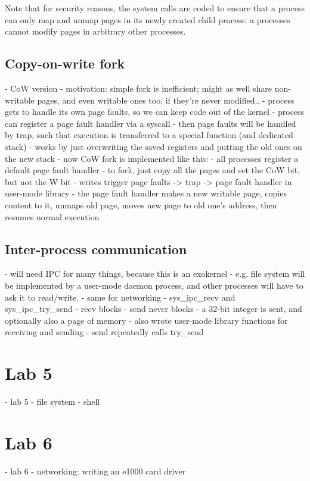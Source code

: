 \documentclass{article}
\begin{document}
Note that for security reasons, the system calls are coded to ensure that a
process can only map and unmap pages in its newly created child process; a
processes cannot modify pages in arbitrary other processes.


\subsection{Copy-on-write fork}

- CoW version
	- motivation: simple fork is inefficient; might as well share non-writable
	  pages, and even writable ones too, if they're never modified..
	- process gets to handle its own page faults, so we can keep code out of
	  the kernel
	- process can register a page fault handler via a syscall
	- then page faults will be handled by trap, such that execution is
	  transferred to a special function (and dedicated stack)
	  	- works by just overwriting the saved registers and putting the old
		  ones on the new stack
	- now CoW fork is implemented like this:
		- all processes register a default page fault handler
		- to fork, just copy all the pages and set the CoW bit, but not the W
		  bit
		- writes trigger page faults -> trap -> page fault handler in
		  user-mode library
		- the page fault handler makes a new writable page, copies content to
		  it, unmaps old page, moves new page to old one's address, then
		  resumes normal execution
 


\subsection{Inter-process communication}
- will need IPC for many things, because this is an exokernel
	- e.g. file system will be implemented by a user-mode daemon process, and
	  other processes will have to ask it to read/write.
	- same for networking
- sys\_ipc\_recv and sys\_ipc\_try\_send
	- recv blocks
	- send never blocks
	- a 32-bit integer is sent, and optionally also a page of memory
	- also wrote user-mode library functions for receiving and sending
		- send repeatedly calls try\_send



\section{Lab 5}
- lab 5
	- file system
	- shell


\section{Lab 6}
- lab 6
	- networking: writing an e1000 card driver
\end{document}
